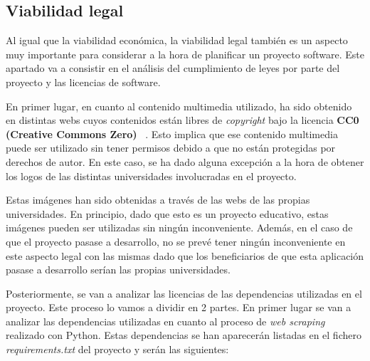 \subsection{Viabilidad legal}
Al igual que la viabilidad económica, la viabilidad legal también es un aspecto muy importante para considerar a la hora de planificar un proyecto software. Este apartado va a consistir en el análisis del cumplimiento de leyes por parte del proyecto y las licencias de software. 

En primer lugar, en cuanto al contenido multimedia utilizado, ha sido obtenido en distintas webs cuyos contenidos están libres de \textit{copyright} bajo la licencia \textbf{CC0 (Creative Commons Zero)} ~\cite{codigoabierto:latex}. Esto implica que ese contenido multimedia puede ser utilizado sin tener permisos debido a que no están protegidas por derechos de autor. En este caso, se ha dado alguna excepción a la hora de obtener los logos de las distintas universidades involucradas en el proyecto.

Estas imágenes han sido obtenidas a través de las webs de las propias universidades. En principio, dado que esto es un proyecto educativo, estas imágenes pueden ser utilizadas sin ningún inconveniente. Además, en el caso de que el proyecto pasase a desarrollo, no se prevé tener ningún inconveniente en este aspecto legal con las mismas dado que los beneficiarios de que esta aplicación pasase a desarrollo serían las propias universidades.

Posteriormente, se van a analizar las licencias de las dependencias utilizadas en el proyecto. Este proceso lo vamos a dividir en 2 partes. En primer lugar se van a analizar las dependencias utilizadas en cuanto al proceso de \textit{web scraping} realizado con Python. Estas dependencias se han aparecerán listadas en el fichero \textit{requirements.txt} del proyecto y serán las siguientes:

